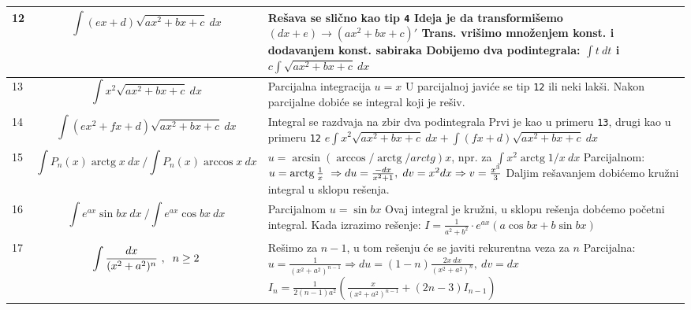 \documentclass{article}
\DeclareMathOperator{\arctg}{arctg}
\begin{document}
\begin{tabular}{|I{0.5cm}|p{7.5cm}|R{10cm}|}
		\hline
		   \vspace{3mm} 12  & \[ \int{(ex+d)\sqrt{ax^2+bx+c} \ dx} \] & Rešava se slično kao tip \texttt{4} \newline Ideja je da transformišemo $(dx+e) \rightarrow (ax^2+bx+c)'$ \newline Trans. vrišimo množenjem konst. i dodavanjem konst. sabiraka \newline Dobijemo dva podintegrala: $\int{t\ dt}$ i $c\int{\sqrt{ax^2+bx+c}\ dx}$ \\
		\hline
		   \vspace{2mm} 13  & \[ \int{x^2\sqrt{ax^2+bx+c} \ dx} \] & Parcijalna integracija $u = x$ \newline U parcijalnoj javiće se tip \texttt{12} ili neki lakši. \newline Nakon parcijalne dobiće se integral koji je rešiv.\\
		\hline
		   \vspace{2mm} 14  & \[ \int{(ex^2+fx+d)\sqrt{ax^2+bx+c} \ dx} \] & Integral se razdvaja na zbir dva podintegrala \newline Prvi je kao u primeru \texttt{13}, drugi kao u primeru \texttt{12} \newline $e\int{x^2\sqrt{ax^2+bx+c}\ dx} + \int{(fx+d)\sqrt{ax^2+bx+c}\ dx}$  \\
		\hline
		   \vspace{3mm} 15  & \[ \int{P_n(x) \arctg x \ dx} \ \Big / \int{P_n(x)\arccos x}\ dx \] & $u = \arcsin(\arccos/\arctg/arctg) x $, npr. za $\int{x^2\arctg 1/x\ dx}$ \newline Parcijalnom: $u = \arctg \frac{1}{x}\ \Rightarrow du = \frac{-dx}{x^2+1}, \hspace{1mm}  dv= x^2dx \Rightarrow v = \frac{x^3}{3}$ \newline  Daljim rešavanjem dobićemo kružni integral u sklopu rešenja.\\
		\hline
		   \vspace{2mm} 16  & \[ \int{e^{ax}\sin bx\ dx} \ \Big/ \int{e^{ax}\cos bx\ dx} \]  & Parcijalnom $u = \sin bx$ \newline Ovaj integral je kružni, u sklopu rešenja dobćemo početni integral. \newline Kada izrazimo rešenje: $I =\frac{1}{a^2+b^2}\cdot e^{ax}(a\cos bx + b\sin bx)$   \\
		\hline
		   \vspace{2mm} 17  & \[ \int{\frac{dx}{(x^2+a^2)^n} }\ , \hspace{2mm} n \geq 2 \]  & Rešimo za $n-1$, u tom rešenju će se javiti rekurentna veza za $n$ \newline  Parcijalna: $u = \frac{1}{(x^2 + a^2)^{n-1}} \Rightarrow du = (1-n)\frac{2x\ dx}{(x^2+a^2)^n},\ dv = dx$ \newline $I_n = \frac{1}{2(n-1)a^2}(\frac{x}{(x^2+a^2)^{n-1}} + (2n-3)I_{n-1}) $ \\

\end{tabular}
\end{document}
